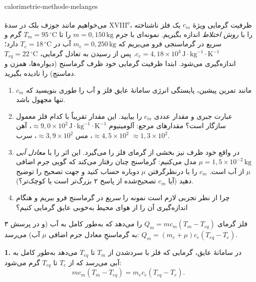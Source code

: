 \begin{exo}{calorimetrie-methode-melanges}

می‌خواهیم مانند جوزف بلک در سدهٔ XVIII\textsuperscript{e}، ظرفیت گرمایی ویژهٔ $c_m$ یک فلز ناشناخته را با \emph{روش اختلاط} اندازه بگیریم. نمونه‌ای با جرم $m=0{,}150\,\text{kg}$ را تا $T_m=95\,{}^\circ\text{C}$ گرم و سریع در گرماسنجی فرو می‌بریم که $m_e=0{,}250\,\text{kg}$ آب در $T_e=18\,{}^\circ\text{C}$ دارد؛ $c_e=4{,}18\times10^3\,\text{J}\!\cdot\!\text{kg}^{-1}\!\cdot\!\text{K}^{-1}$. پس از رسیدن به تعادل گرمایی، $T_{eq}=22\,{}^\circ\text{C}$ اندازه‌گیری می‌شود. ابتدا ظرفیت گرمایی خود ظرف گرماسنج (دیواره‌ها، همزن و دماسنج) را نادیده بگیرید.

\begin{enumerate}
  \item مانند تمرین پیشین، پایستگی انرژی سامانهٔ عایق فلز و آب را طوری بنویسید که $c_m$ تنها مجهول باشد.
  \item عبارت جبری و مقدار عددی $c_m$ را بیابید. این مقدار تقریباً با کدام فلز معمول سازگار است؟ مقدارهای مرجع: آلومینیوم $\approx9{,}0\times10^2\,\text{J}\!\cdot\!\text{kg}^{-1}\!\cdot\!\text{K}^{-1}$، آهن $\approx4{,}5\times10^2$، مس $\approx3{,}9\times10^2$، سرب $\approx1{,}3\times10^2$.
  \item در واقع خود ظرف نیز بخشی از گرمای فلز را می‌گیرد. این اثر را با \emph{معادل آبی} $\mu=1{,}5\times10^{-2}\,\text{kg}$ مدل می‌کنیم: گرماسنج چنان رفتار می‌کند که گویی جرم اضافی $\mu$ از آب است. $c_m$ را با درنظرگرفتن $\mu$ دوباره حساب کنید و جهت تصحیح را توضیح دهید (آیا $c_m$ تصحیح‌شده از پاسخ ۲ بزرگ‌تر است یا کوچک‌تر؟).
  \item چرا از نظر تجربی لازم است نمونه را \emph{سریع} در گرماسنج فرو ببریم و هنگام اندازه‌گیری آن را از هوای محیط به‌خوبی عایق گرمایی کنیم؟
\end{enumerate}

\begin{indication}
فلز گرمای $Q_m=mc_m(T_m-T_{eq})$ را می‌دهد که به‌طور کامل به آب (و در پرسش ۳ به گرماسنجِ معادل جرم اضافی $\mu$ آب) می‌رسد: $Q_m=(m_e+\mu)c_e(T_{eq}-T_e)$.
\end{indication}

\begin{solution}
\textbf{1.} در سامانهٔ عایق، گرمایی که فلز با سردشدن از $T_m$ تا $T_{eq}$ می‌دهد به‌طور کامل به آبی می‌رسد که از $T_e$ تا $T_{eq}$ گرم می‌شود:
\[
mc_m(T_m-T_{eq})=m_ec_e(T_{eq}-T_e).
\]


\end{solution}
\end{exo}
